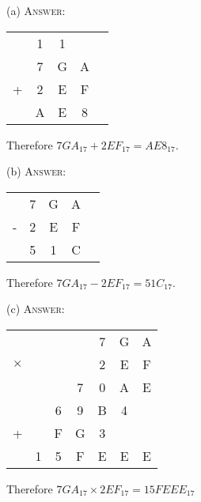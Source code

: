 
(a)
\textsc{Answer:}\vspace{-2mm}
\begin{answerlong}
\begin{longtable}{ccccc}
  & 1 & 1 &   \\
  & 7 & G & A \\
+ & 2 & E & F \\ \hline
  & A & E & 8 \\ \hline
\end{longtable}
Therefore $7GA_{17} + 2EF_{17} = AE8_{17}$.
\end{answerlong}
  
(b)
\textsc{Answer:}\vspace{-2mm}
\begin{answerlong}
\begin{longtable}{ccccc}
  & 7 & G & A \\
- & 2 & E & F \\ \hline
  & 5 & 1 & C \\ \hline
\end{longtable}
Therefore $7GA_{17} - 2EF_{17} = 51C_{17}$.
\end{answerlong}

(c)
\textsc{Answer:}\vspace{-2mm}
\begin{answerlong}
\begin{longtable}{ccccccc}
         &   &   &   & 7 & G & A \\
$\times$ &   &   &   & 2 & E & F \\ \hline
         &   &   & 7 & 0 & A & E \\
         &   & 6 & 9 & B & 4 &   \\ 
+        &   & F & G & 3 &   &   \\ \hline
         & 1 & 5 & F & E & E & E \\ \hline
\end{longtable}
Therefore $7GA_{17} \times 2EF_{17} = 15FEEE_{17}$
\end{answerlong}
